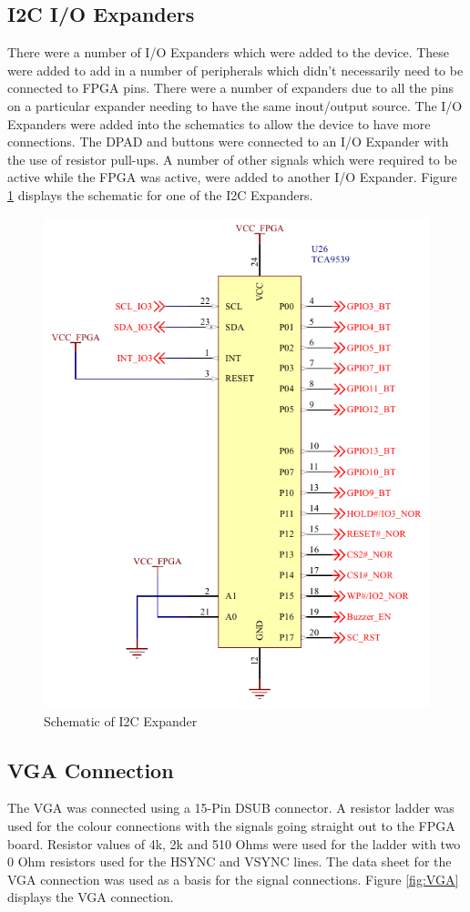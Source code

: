 \subsection{I2C I/O Expanders}

	There were a number of I/O Expanders which were added to the device. These were added to add in a number of peripherals which didn't necessarily need to be connected to FPGA pins. There were a number of expanders due to all the pins on a particular expander needing to have the same inout/output source. 
The I/O Expanders were added into the schematics to allow the device to have more connections. The DPAD and buttons were connected to an I/O Expander with the use of resistor pull-ups. A number of other signals which were required to be active while the FPGA was active, were added to another I/O Expander.
Figure \ref{fig:I2C} displays the schematic for one of the I2C Expanders. 

\begin{figure}
	\includegraphics[width=0.5\linewidth]{Figures/I2C_Expander.pdf}\centering
	\caption{Schematic of I2C Expander}
	\label{fig:I2C}
\end{figure}

\subsection{VGA Connection}
\label{chap:VGA}

	The VGA was connected using a 15-Pin DSUB connector. 
A resistor ladder was used for the colour connections with the signals going straight out to the FPGA board.
Resistor values of 4k, 2k and 510 Ohms were used for the ladder with two 0 Ohm resistors used for the HSYNC and VSYNC lines. 
The data sheet for the VGA connection was used as a basis for the signal connections. 
Figure \ref{fig:VGA} displays the VGA connection. 

